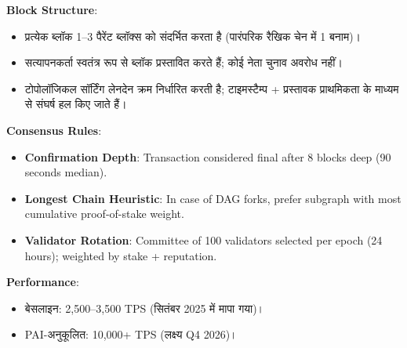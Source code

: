 \documentclass[11pt]{article}
\begin{document}
\begin{itemize}[noitemsep]
\begin{itemize}[noitemsep]
\textbf{Block Structure}:
\begin{itemize}[noitemsep]
  \item प्रत्येक ब्लॉक 1--3 पैरेंट ब्लॉक्स को संदर्भित करता है (पारंपरिक रैखिक चेन में 1 बनाम)।
  \item सत्यापनकर्ता स्वतंत्र रूप से ब्लॉक प्रस्तावित करते हैं; कोई नेता चुनाव अवरोध नहीं।
  \item टोपोलॉजिकल सॉर्टिंग लेनदेन क्रम निर्धारित करती है; टाइमस्टैम्प + प्रस्तावक प्राथमिकता के माध्यम से संघर्ष हल किए जाते हैं।
\end{itemize}

\textbf{Consensus Rules}:
\begin{itemize}[noitemsep]
  \item \textbf{Confirmation Depth}: Transaction considered final after 8 blocks deep (90 seconds median).
  \item \textbf{Longest Chain Heuristic}: In case of DAG forks, prefer subgraph with most cumulative proof-of-stake weight.
  \item \textbf{Validator Rotation}: Committee of 100 validators selected per epoch (24 hours); weighted by stake + reputation.
\end{itemize}

\textbf{Performance}:
\begin{itemize}[noitemsep]
  \item बेसलाइन: 2,500--3,500 TPS (सितंबर 2025 में मापा गया)।
  \item PAI-अनुकूलित: 10,000+ TPS (लक्ष्य Q4 2026)।
\end{itemize}


\end{itemize}
\end{itemize}
\end{document}
